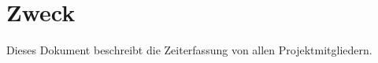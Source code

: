 \documentclass[
	ngerman,
	toc=listof, %
	toc=bibliography, %
	footnotes=multiple, %
	parskip=half, %
	numbers=noendperiod %
]{scrartcl}
\newcommand{\vorlagenOrdner}{../99_Vorlagen} %
\begin{document}
\thispagestyle{plain}

\cleardoublepage


\section*{Zweck}
Dieses Dokument beschreibt die Zeiterfassung von allen Projektmitgliedern.

{}
\tableofcontents
\cleardoublepage

\let\stdsection\section
\renewcommand\section{\clearpage\stdsection}

\end{document}
